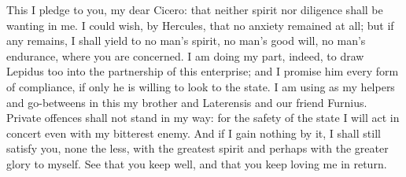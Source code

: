  This I pledge to you, my dear Cicero: that neither spirit nor diligence shall be wanting in me. I could wish, by Hercules, that no anxiety remained at all; but if any remains, I shall yield to no man's spirit, no man's good will, no man's endurance, where you are concerned. I am doing my part, indeed, to draw Lepidus too into the partnership of this enterprise; and I promise him every form of compliance, if only he is willing to look to the state. I am using as my helpers and go-betweens in this my brother and Laterensis and our friend Furnius. Private offences shall not stand in my way: for the safety of the state I will act in concert even with my bitterest enemy. And if I gain nothing by it, I shall still satisfy you, none the less, with the greatest spirit and perhaps with the greater glory to myself. See that you keep well, and that you keep loving me in return.
